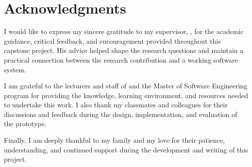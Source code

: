 \chapter*{Acknowledgments}

I would like to express my sincere gratitude to my supervisor,
\SupervisorName, for the academic guidance, critical feedback, and
encouragement provided throughout this capstone project. His advice helped
shape the research questions and maintain a practical connection between the
research contribution and a working software system.

I am grateful to the lecturers and staff of \InstitutionName{} and the Master
of Software Engineering program for providing the knowledge, learning
environment, and resources needed to undertake this work. I also thank my
classmates and colleagues for their discussions and feedback during the design,
implementation, and evaluation of the prototype.

Finally, I am deeply thankful to my family and my love for their patience,
understanding, and continued support during the development and writing of this
project.

